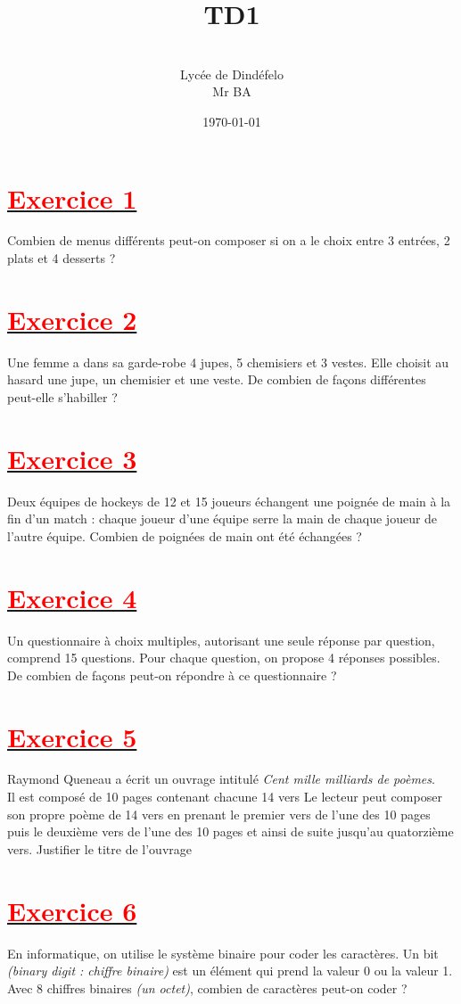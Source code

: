 \documentclass[12pt]{article}
\author{\\Lycée de Dindéfelo\\Mr BA}
\title{\textbf{TD1}}
\date{\today}
\begin{document}
\maketitle
\newpage
\section*{\underline{\textbf{\textcolor{red}{Exercice 1}}}}
Combien de menus différents peut-on composer si on a le choix entre 3 entrées, 2 plats et 4 desserts ?
\section*{\underline{\textbf{\textcolor{red}{Exercice 2}}}}
Une femme a dans sa garde-robe 4 jupes, 5 chemisiers et 3 vestes. Elle choisit au hasard une jupe, un chemisier et une veste. De combien de façons différentes peut-elle s’habiller ?
\section*{\underline{\textbf{\textcolor{red}{Exercice 3}}}}
Deux équipes de hockeys de 12 et 15 joueurs échangent une poignée de main à la fin d’un match : chaque joueur d’une équipe serre la main de chaque joueur de l’autre équipe. Combien de poignées de main ont été échangées ?
\section*{\underline{\textbf{\textcolor{red}{Exercice 4}}}}
Un questionnaire à choix multiples, autorisant une seule réponse par question, comprend 15 questions. Pour chaque question, on propose 4 réponses possibles.
De combien de façons peut-on répondre à ce questionnaire ?
\section*{\underline{\textbf{\textcolor{red}{Exercice 5}}}}
Raymond Queneau a écrit un ouvrage intitulé \textit{Cent mille milliards de poèmes}.\\
Il est composé de 10 pages contenant chacune 14 vers
Le lecteur peut composer son propre poème de 14 vers en
prenant le premier vers de l’une des 10 pages puis le deuxième
vers de l’une des 10 pages et ainsi de suite jusqu’au
quatorzième vers. Justifier le titre de l’ouvrage
\section*{\underline{\textbf{\textcolor{red}{Exercice 6}}}}
En informatique, on utilise le système binaire pour coder les caractères.
Un bit \textit{(binary digit : chiffre binaire)} est un élément qui prend la valeur 0 ou la valeur 1. Avec 8 chiffres binaires \textit{(un octet)}, combien de caractères peut-on coder ?
\end{document}
